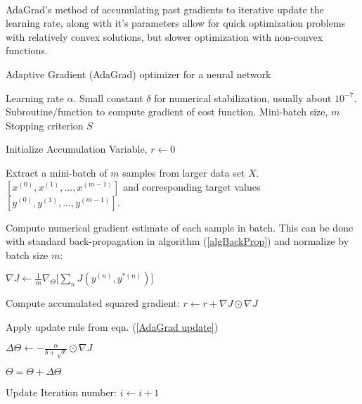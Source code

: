 \documentclass[12pt,letterpaper]{article}
\begin{document}
\paragraph*{}AdaGrad's method of accumulating past gradients to iterative update the learning rate, along with it's parameters allow for quick optimization problems with relatively convex solutions, but slower optimization with non-convex functions.

\begin{algorithm}[H]
\caption{Adaptive Gradient (AdaGrad) optimizer for a neural network}
\label{algAdaGrad}

\begin{algorithmic}

\REQUIRE Learning rate $\alpha$.
\REQUIRE Small constant $\delta$ for numerical stabilization, usually about $10^{-7}$.
\REQUIRE Subroutine/function to compute gradient of cost function.
\REQUIRE Mini-batch size, $m$
\REQUIRE Stopping criterion $S$

\item Initialize Accumulation Variable, $r \leftarrow 0$

	\item Extract a mini-batch of $m$ samples from larger data set $X$. $[x^{(0)},x^{(1)},...,x^{(m-1)}]$ and corresponding target values 
	$[y^{(0)},y^{(1)},...,y^{(m-1)}]$.
	\item Compute numerical gradient estimate of each sample in batch. This can be done with standard back-propagation in algorithm (\ref{algBackProp}) and 			 	normalize by batch size $m$:
	\item $\nabla J \leftarrow \frac{1}{m}\nabla_{\Theta} \Big[ \sum_n J(y^{(n)},y^{*(n)}) \Big] $
	\item Compute accumulated squared gradient: $r \leftarrow r  + \nabla J \odot \nabla J$
	\item Apply update rule from eqn. (\ref{AdaGrad update})
	\item $\Delta \Theta \leftarrow -\frac{\alpha}{\delta+\sqrt{r}} \odot \nabla J$
	\item $\Theta = \Theta + \Delta \Theta$	
	\item Update Iteration number: $i \leftarrow i + 1$
\ENDWHILE

\end{algorithmic}
\end{algorithm}

\end{document}
